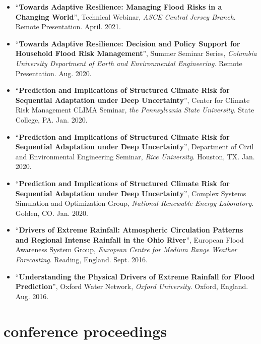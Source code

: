 \documentclass[10pt,oneside]{article}
\begin{document}
\begin{itemize}[label={}]

  \item \enquote{\textbf{Towards Adaptive Resilience: Managing Flood Risks in a Changing World}}, Technical Webinar,  \textit{ASCE Central Jersey Branch}. Remote Presentation. April. 2021.

  \item \enquote{\textbf{Towards Adaptive Resilience: Decision and Policy Support for Household Flood Risk Management}}, Summer Seminar Series,  \textit{Columbia University Department of Earth and Environmental Engineering}. Remote Presentation. Aug. 2020.

  \item \enquote{\textbf{Prediction and Implications of Structured Climate Risk for Sequential Adaptation under Deep Uncertainty}}, Center for Climate Risk Management CLIMA Seminar,  \textit{the Pennsylvania State University}. State College, PA. Jan. 2020.

  \item \enquote{\textbf{Prediction and Implications of Structured Climate Risk for Sequential Adaptation under Deep Uncertainty}}, Department of Civil and Environmental Engineering Seminar,  \textit{Rice University}. Houston, TX. Jan. 2020.

  \item \enquote{\textbf{Prediction and Implications of Structured Climate Risk for Sequential Adaptation under Deep Uncertainty}}, Complex Systems Simulation and Optimization Group,  \textit{National Renewable Energy Laboratory}. Golden, CO. Jan. 2020.

  \item \enquote{\textbf{Drivers of Extreme Rainfall: Atmospheric Circulation Patterns and Regional Intense Rainfall in the Ohio River}}, European Flood Awareness System Group,  \textit{European Centre for Medium Range Weather Forecasting}. Reading, England. Sept. 2016.

  \item \enquote{\textbf{Understanding the Physical Drivers of Extreme Rainfall for Flood Prediction}}, Oxford Water Network,  \textit{Oxford University}. Oxford, England. Aug. 2016.

\end{itemize}

\section{conference proceedings}
\end{document}
